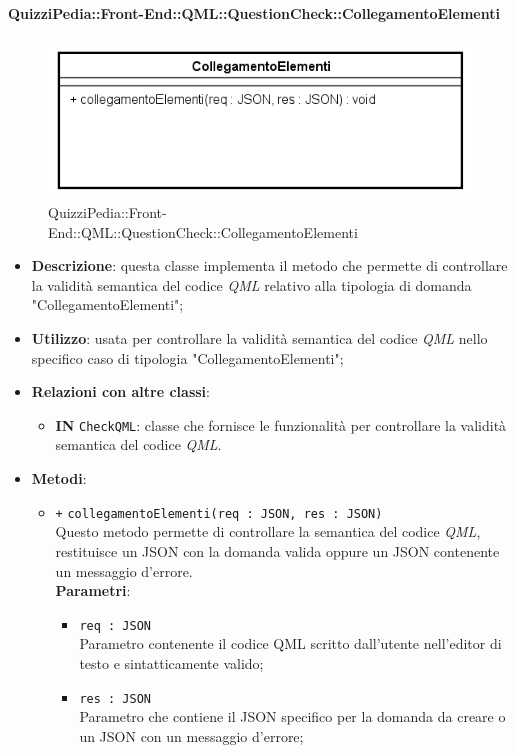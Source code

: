 \paragraph[QuizziPedia::Front-End::QML:: \\ QuestionCheck::Collegamentoelementi]{QuizziPedia::Front-End::QML::QuestionCheck::CollegamentoElementi}
\begin{figure} [ht]
	\centering
	\includegraphics[scale=0.80]{UML/Classi/Front-End/QuizziPedia_Front-end_QML_QuestionCheck_CollegamentoElementi.png}
	\caption{QuizziPedia::Front-End::QML::QuestionCheck::CollegamentoElementi}
\end{figure} \FloatBarrier
\begin{itemize}
	\item \textbf{Descrizione}: questa classe implementa il metodo che permette di controllare la validità semantica del codice \textit{QML} relativo alla tipologia di domanda "CollegamentoElementi";
	\item \textbf{Utilizzo}: usata per controllare la validità semantica del codice \textit{QML} nello specifico caso di tipologia "CollegamentoElementi";
	\item \textbf{Relazioni con altre classi}:
	\begin{itemize}
		\item \textbf{IN} \texttt{CheckQML}: classe che fornisce le funzionalità per controllare la validità semantica del codice \textit{QML}.
	\end{itemize}
	\item \textbf{Metodi}:
	\begin{itemize}
		\item \texttt{+} \texttt{collegamentoElementi(req : JSON, res : JSON)} \\
		Questo metodo permette di controllare la semantica del codice \textit{QML}, restituisce un JSON con la domanda valida oppure un JSON contenente un messaggio d'errore. \\
		\textbf{Parametri}:
		\begin{itemize}
			\item \texttt{req : JSON} \\
			Parametro contenente il codice QML scritto dall'utente nell'editor di testo e sintatticamente valido;
			\item \texttt{res : JSON} \\
			Parametro che contiene il JSON specifico per la domanda da creare o un JSON con un messaggio d'errore;
		\end{itemize}
	\end{itemize}
\end{itemize}

